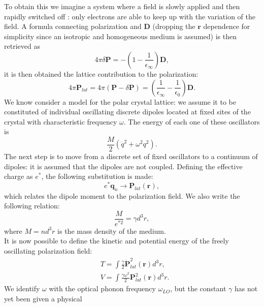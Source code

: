 \documentclass[12pt, a4paper]{report}
\numberwithin{equation}{section}
\begin{document}
To obtain this we imagine a system where a field is slowly applied and then rapidly switched off \cite{haken1976quantum}: only 
electrons are able to keep up with the variation of the field. A formula connecting polarization and $\mathbf{D}$ (dropping the $\mathbf{r}$ dependence for simplicity 
since an isotropic and homogeneous medium is assumed) is then retrieved as
\begin{equation}
    4\pi \delta \mathbf{P} = -\left(1-\frac{1}{\epsilon_\infty}\right)\mathbf{D},
\end{equation}
it is then obtained the lattice contribution to the polarization:
\begin{equation}
    4\pi \mathbf{P}_{lat} = 4\pi(\mathbf{P}-\delta \mathbf{P}) = \left(\frac{1}{\epsilon_\infty}-\frac{1}{\epsilon_0}\right)\mathbf{D}.
    \label{eq_polarization_lattice}
\end{equation}
We know consider a model for the polar crystal lattice: we assume it to be constituted of individual oscillating discrete dipoles 
located at fixed sites of the crystal with characteristic frequency $\omega$. The energy of each one of these oscillators is 
\begin{equation}
    \frac{M}{2}(\dot{q}^2+\omega^2q^2).
\end{equation}
The next step is to move from a discrete set of fixed oscillators to a continuum of dipoles: it is assumed that the dipoles are not 
coupled. Defining the effective charge as $e^*$, the following substitution is made:
\begin{equation}
    e^*\mathbf{q}_n\to \mathbf{P}_{lat}(\mathbf{r}),
\end{equation}
which relates the dipole moment to the polarization field. We also write the following relation:
\begin{equation}
    \frac{M}{e^{*2}}=\gamma d^3r,
\end{equation}
where $M=nd^3r$ is the mass density of the medium.\\
It is now possible to define the kinetic and potential energy of the freely oscillating polarization field:
\begin{equation}
\begin{split}
    &T=\int \frac{\gamma}{2}\dot{\mathbf{P}}_{lat}^2(\mathbf{r})d^3r,\\
    &V=\int \frac{\gamma\omega^2}{2}\mathbf{P}_{lat}^2(\mathbf{r})d^3r.
\end{split}
\end{equation}
We identify $\omega$ with the optical phonon frequency $\omega_{LO}$, but the constant $\gamma$ has not yet been given a physical 
\end{document}
